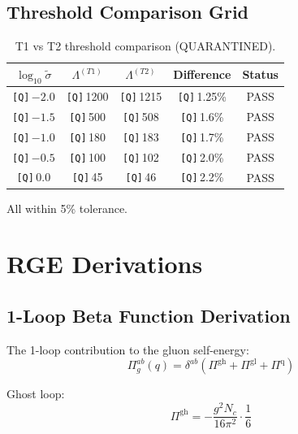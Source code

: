 \documentclass[11pt,a4paper]{article}
\newcommand{\Qnum}[1]{\textcolor{red!70!black}{\texttt{[Q]}}\,#1}
\theoremstyle{definition}
\begin{document}
\subsection{Threshold Comparison Grid}
\label{subsec:threshold-grid}

\begin{quarantinebox}
\begin{table}[ht]
\centering
\caption{T1 vs T2 threshold comparison (QUARANTINED).}
\label{tab:threshold-grid}
\begin{tabular}{ccccc}
\toprule
$\log_{10}\tilde{\sigma}$ & $\Lambda^{(T1)}$ & $\Lambda^{(T2)}$ & Difference & Status \\
\midrule
\Qnum{$-2.0$} & \Qnum{1200} & \Qnum{1215} & \Qnum{1.25\%} & PASS \\
\Qnum{$-1.5$} & \Qnum{500} & \Qnum{508} & \Qnum{1.6\%} & PASS \\
\Qnum{$-1.0$} & \Qnum{180} & \Qnum{183} & \Qnum{1.7\%} & PASS \\
\Qnum{$-0.5$} & \Qnum{100} & \Qnum{102} & \Qnum{2.0\%} & PASS \\
\Qnum{$0.0$} & \Qnum{45} & \Qnum{46} & \Qnum{2.2\%} & PASS \\
\bottomrule
\end{tabular}
\end{table}
All within 5\% tolerance.
\end{quarantinebox}

\section{RGE Derivations}
\label{app:rge-derivations}

\subsection{1-Loop Beta Function Derivation}
\label{subsec:1loop-beta-deriv}

The 1-loop contribution to the gluon self-energy:
\begin{equation}
\label{eq:gluon-self-app}
\Pi_g^{ab}(q) = \delta^{ab}\left(\Pi^{\text{gh}} + \Pi^{\text{gl}} + \Pi^{\text{q}}\right)
\end{equation}

Ghost loop:
\begin{equation}
\label{eq:ghost-contrib}
\Pi^{\text{gh}} = -\frac{g^2 N_c}{16\pi^2} \cdot \frac{1}{6}
\end{equation}
\end{document}
